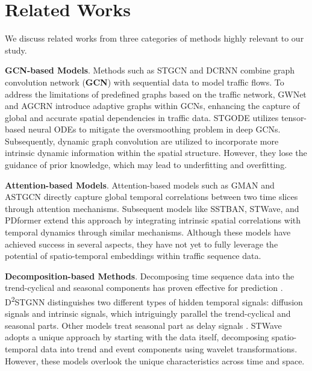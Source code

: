 \section{Related Works}
We discuss related works from three categories of methods highly relevant to our study. %

\textbf{GCN-based Models}. Methods such as STGCN \cite{yu2017STGCN} and DCRNN \cite{li2018DCRNN} combine graph convolution network (\textbf{GCN}) with sequential data to model traffic flows. To address the limitations of predefined graphs based on the traffic network, GWNet \cite{wu2019GWNet} and AGCRN \cite{bai2020AGCRN} introduce adaptive graphs within GCNs, enhancing the capture of global and accurate spatial dependencies in traffic data. STGODE \cite{fang2021STGODE} utilizes tensor-based neural ODEs to mitigate the oversmoothing problem in deep GCNs. Subsequently, dynamic graph convolution \cite{han2021DMSTGCN, lan2022dstagnn, zhao2023DyHSL} are utilized to incorporate more intrinsic dynamic information within the spatial structure. However, they lose the guidance of prior knowledge, which may lead to underfitting and overfitting.

\textbf{Attention-based Models}. Attention-based models such as GMAN \cite{zheng2020GMANaaai} and ASTGCN \cite{guo2019ASTGCN} directly capture global temporal correlations between two time slices through attention mechanisms. Subsequent models like SSTBAN, STWave, and PDformer \cite{guo2023SSTBAN,fang2023STWave,jiang2023pdformer} extend this approach by integrating intrinsic spatial correlations with temporal dynamics through similar mechanisms. Although these models have achieved success in several aspects, they have not yet to fully leverage the potential of spatio-temporal embeddings within traffic sequence data.

\textbf{Decomposition-based Methods}. Decomposing time sequence data into the trend-cyclical and seasonal components has proven effective for prediction \cite{wu2021Autoformer,wang2024towards}. D\textsuperscript{2}STGNN \cite{D2STGNN} distinguishes two different types of hidden temporal signals: diffusion signals and intrinsic signals, which intriguingly parallel the trend-cyclical and seasonal parts. Other models treat seasonal part as delay signals \cite{jiang2023pdformer, long2024STDDE}. STWave \cite{fang2023STWave} adopts a unique approach by starting with the data itself, decomposing spatio-temporal data into trend and event components using wavelet transformations. However, these models overlook the unique characteristics across time and space.

